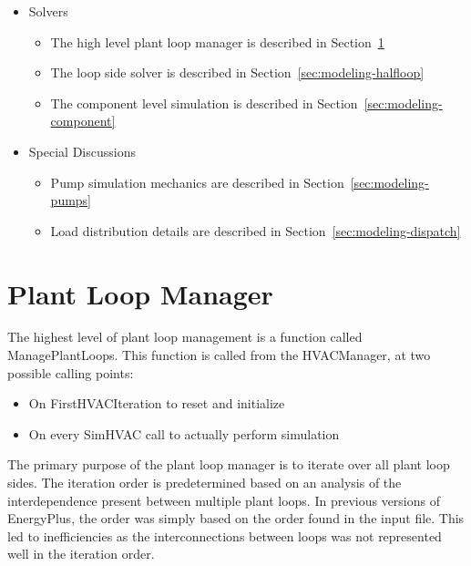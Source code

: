 \documentclass{report}
\begin{document}
    \begin{itemize}
      \item Solvers
      \begin{itemize}
        \item The high level plant loop manager is described in Section~\ref{sec:modeling-loop}
        \item The loop side solver is described in Section~\ref{sec:modeling-halfloop}
        \item The component level simulation is described in Section~\ref{sec:modeling-component}
      \end{itemize}
      \item Special Discussions
      \begin{itemize}
        \item Pump simulation mechanics are described in Section~\ref{sec:modeling-pumps}
        \item Load distribution details are described in Section~\ref{sec:modeling-dispatch}
      \end{itemize}
    \end{itemize}

    \section{Plant Loop Manager}\label{sec:modeling-loop}

      The highest level of plant loop management is a function called ManagePlantLoops.
      This function is called from the HVACManager, at two possible calling points:

      \begin{itemize}
        \item On FirstHVACIteration to reset and initialize
        \item On every SimHVAC call to actually perform simulation
      \end{itemize}

      The primary purpose of the plant loop manager is to iterate over all plant loop sides.
      The iteration order is predetermined based on an analysis of the interdependence present between multiple plant loops.
      In previous versions of EnergyPlus, the order was simply based on the order found in the input file.
      This led to inefficiencies as the interconnections between loops was not represented well in the iteration order.
\end{document}
